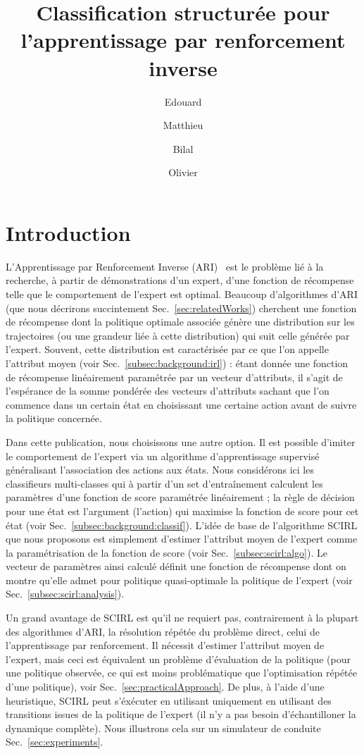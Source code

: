 \documentclass[english,utf8]{./hermes-journal}
\title[SCIRL]{Classification structurée pour l'apprentissage par renforcement inverse}
\author[1,2]{Edouard}{Klein}
\author[2,3]{Matthieu}{Geist}
\author[2]{Bilal}{Piot}
\author[2,3]{Olivier}{Pietquin}
\begin{document}
\maketitle

\newpage
\section{Introduction}
\label{sec:intro}

L'Apprentissage par Renforcement Inverse (ARI)~\cite{Russell:1998} est le problème lié à la recherche, à partir de démonstrations d'un expert, d'une fonction de récompense telle que le comportement de l'expert est optimal. Beaucoup d'algorithmes d'ARI (que nous décrirons succintement Sec.~\ref{sec:relatedWorks}) cherchent une fonction de récompense dont la politique optimale associée génère une distribution sur les trajectoires (ou une grandeur liée à cette distribution) qui suit celle générée par l'expert. Souvent, cette distribution est caractérisée par ce que l'on appelle l'attribut moyen (voir Sec.~\ref{subsec:background:irl}) : étant donnée une fonction de récompense linéairement paramétrée par un vecteur d'attributs, il s'agit de l'espérance de la somme pondérée des vecteurs d'attributs sachant que l'on commence dans un certain état en choisissant une certaine action avant de suivre la politique concernée.

Dans cette publication, nous choisissons une autre option. Il est possible d'imiter le comportement de l'expert via un algorithme d'apprentissage supervisé généralisant l'association des actions aux états. Nous considérons ici les classifieurs multi-classes qui à partir d'un set d'entraînement calculent les paramètres d'une fonction de score paramétrée linéairement ; la règle de décision pour une état est l'argument (l'action) qui maximise la fonction de score pour cet état (voir Sec.~\ref{subsec:background:classif}). L'idée de base de l'algorithme SCIRL que nous proposons est simplement d'estimer l'attribut moyen de l'expert comme la paramétrisation de la fonction de score (voir Sec.~\ref{subsec:scirl:algo}). Le vecteur de paramètres ainsi calculé définit une fonction de récompense dont on montre qu'elle admet pour politique quasi-optimale la politique de l'expert (voir Sec.~\ref{subsec:scirl:analysis}).

Un grand avantage de SCIRL est qu'il ne requiert pas, contrairement à la plupart des algorithmes d'ARI, la résolution répétée du problème direct, celui de l'apprentissage par renforcement. Il nécessit d'estimer l'attribut moyen de l'expert, mais ceci est équivalent un problème d'évaluation de la politique (pour une politique observée, ce qui est moins problématique que l'optimisation répétée d'une politique), voir Sec.~\ref{sec:practicalApproach}.
De plus, à l'aide d'une heuristique, SCIRL peut s'éxécuter en utilisant uniquement en utilisant des transitions issues de la politique de l'expert (il n'y a pas besoin d'échantilloner la dynamique complète). Nous illustrons cela sur un simulateur de conduite Sec.~\ref{sec:experiments}.
\end{document}
